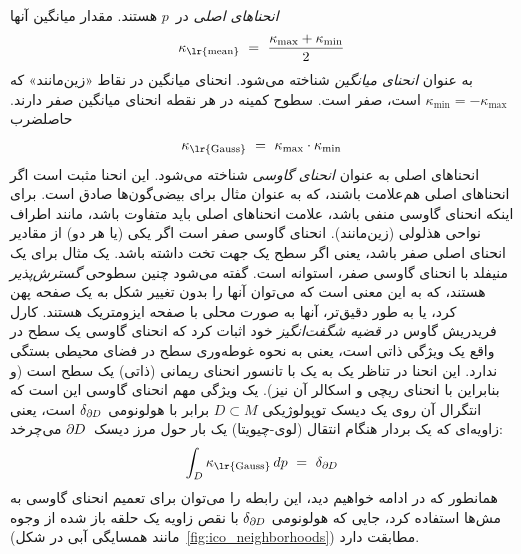 \emph{انحناهای اصلی} در~$p$ هستند.
مقدار میانگین آنها
\begin{align}\label{eq:mean_curvature}
    \kappa_{\textup{\lr{mean}}} \ =\ \frac{\kappa_{\max}+\kappa_{\min}}{2}
\end{align}
به عنوان \emph{انحنای میانگین} شناخته می‌شود.
انحنای میانگین در نقاط «زین‌مانند» که $\kappa_{\min} = -\kappa_{\max}$ است، صفر است.
سطوح کمینه در هر نقطه انحنای میانگین صفر دارند.
حاصلضرب
\begin{align}
    \kappa_{\textup{\lr{Gauss}}}\ =\ \kappa_{\max} \cdot \kappa_{\min}
\end{align}
انحناهای اصلی به عنوان \emph{انحنای گاوسی} شناخته می‌شود.
این انحنا مثبت است اگر انحناهای اصلی هم‌علامت باشند، که به عنوان مثال برای بیضی‌گون‌ها صادق است.
برای اینکه انحنای گاوسی منفی باشد، علامت انحناهای اصلی باید متفاوت باشد، مانند اطراف نواحی هذلولی (زین‌مانند).
انحنای گاوسی صفر است اگر یکی (یا هر دو) از مقادیر انحنای اصلی صفر باشد، یعنی اگر سطح یک جهت تخت داشته باشد.
یک مثال برای یک منیفلد با انحنای گاوسی صفر، استوانه است.
گفته می‌شود چنین سطوحی \emph{گسترش‌پذیر} هستند، که به این معنی است که می‌توان آنها را بدون تغییر شکل به یک صفحه پهن کرد، یا به طور دقیق‌تر، آنها به صورت محلی با صفحه ایزومتریک هستند.
کارل فریدریش گاوس در \emph{قضیه شگفت‌انگیز} خود اثبات کرد که انحنای گاوسی یک سطح در واقع یک ویژگی ذاتی است، یعنی به نحوه غوطه‌وری سطح در فضای محیطی بستگی ندارد.
این انحنا در تناظر یک به یک با تانسور انحنای ریمانی (ذاتی) یک سطح است (و بنابراین با انحنای ریچی و اسکالر آن نیز).
یک ویژگی مهم انحنای گاوسی این است که انتگرال آن روی یک دیسک توپولوژیکی $D \subset M$ برابر با هولونومی $\delta_{\partial\mkern-1mu D}$ است، یعنی زاویه‌ای که یک بردار هنگام انتقال (لوی-چیویتا) یک بار حول مرز دیسک~$\partial\mkern-1mu D$ می‌چرخد:
\begin{align}\label{eq:gauss_curvature_holonomy_smooth}
    \int_{D} \kappa_{\textup{\lr{Gauss}}}\, dp\ =\ \delta_{\partial\mkern-1mu D}
\end{align}
همانطور که در ادامه خواهیم دید، این رابطه را می‌توان برای تعمیم انحنای گاوسی به مش‌ها استفاده کرد، جایی که هولونومی $\delta_{\partial\mkern-1mu D}$ با نقص زاویه یک حلقه باز شده از وجوه (مانند همسایگی آبی در شکل~\ref{fig:ico_neighborhoods}) مطابقت دارد.

